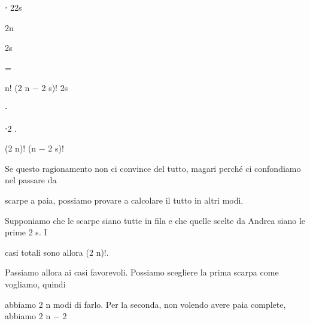 \documentclass[a4paper,portrait,12pt]{article}
\begin{document}
\begin{flushleft}
⋅ 22s
\end{flushleft}


\begin{flushleft}
2n
\end{flushleft}


\begin{flushleft}
2s
\end{flushleft}





=





\begin{flushleft}
n! (2 n $-$ 2 s)! 2s
\end{flushleft}


⋅


⋅2 .


\begin{flushleft}
(2 n)! (n $-$ 2 s)!
\end{flushleft}





\begin{flushleft}
Se questo ragionamento non ci convince del tutto, magari perch\'{e} ci confondiamo nel passare da
\end{flushleft}


\begin{flushleft}
scarpe a paia, possiamo provare a calcolare il tutto in altri modi.
\end{flushleft}


\begin{flushleft}
Supponiamo che le scarpe siano tutte in fila e che quelle scelte da Andrea siano le prime 2 s. I
\end{flushleft}


\begin{flushleft}
casi totali sono allora (2 n)!.
\end{flushleft}


\begin{flushleft}
Passiamo allora ai casi favorevoli. Possiamo scegliere la prima scarpa come vogliamo, quindi
\end{flushleft}


\begin{flushleft}
abbiamo 2 n modi di farlo. Per la seconda, non volendo avere paia complete, abbiamo 2 n $-$ 2
\end{flushleft}
\end{document}
